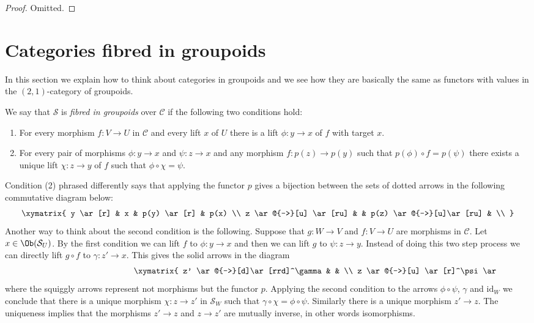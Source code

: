 \begin{proof}
Omitted.
\end{proof}





\section{Categories fibred in groupoids}
\label{section-fibred-groupoids}

\noindent
In this section we explain how to think about categories in groupoids
and we see how they are basically the same as functors with
values in the $(2, 1)$-category of groupoids.

\begin{definition}
\label{definition-fibred-groupoids}
We say that $\mathcal{S}$ is {\it fibred in groupoids} over $\mathcal{C}$ if
the following two conditions hold:
\begin{enumerate}
\item For every morphism $f : V \to U$ in $\mathcal{C}$ and every
lift $x$ of $U$ there is a lift $\phi : y \to x$ of $f$ with
target $x$.
\item For every pair of morphisms $\phi : y \to x$ and $ \psi : z \to x$
and any morphism $f : p(z) \to p(y)$ such that $p(\phi) \circ f = p(\psi)$
there exists a unique lift $\chi : z \to y$ of $f$ such that
$\phi \circ \chi = \psi$.
\end{enumerate}
\end{definition}

\noindent
Condition (2) phrased differently says that
applying the functor $p$ gives a bijection between the sets
of dotted arrows in the following commutative diagram below:
$$
\xymatrix{
y \ar[r] & x & p(y) \ar[r] & p(x) \\
z \ar@{-->}[u] \ar[ru] & & p(z) \ar@{-->}[u]\ar[ru] & \\
}
$$
Another way to think about the second condition is the following.
Suppose that $g : W \to V$ and $f : V \to U$ are morphisms in $\mathcal{C}$.
Let $x \in \Ob(\mathcal{S}_U)$. By the first condition we can lift
$f$ to $ \phi : y \to x$ and then we can lift $g$ to $\psi : z \to y$.
Instead of doing this two step process we can directly lift $g \circ f$ to
$\gamma : z' \to x$. This gives the solid arrows in the diagram
\begin{equation}
\label{equation-fibred-groupoids}
\vcenter{
\xymatrix{
z' \ar@{-->}[d]\ar[rrd]^\gamma & & \\
z \ar@{-->}[u] \ar[r]^\psi \ar@{~>}[d]^p &
y \ar[r]^\phi \ar@{~>}[d]^p &
x \ar@{~>}[d]^p
\\
W \ar[r]^g & V \ar[r]^f & U \\
}
}
\end{equation}
where the squiggly arrows represent not morphisms but the functor $p$.
Applying the second condition to the arrows $\phi \circ \psi$, $\gamma$
and $\text{id}_W$ we conclude that there is a unique morphism
$\chi : z \to z'$ in $\mathcal{S}_W$ such that
$\gamma \circ \chi = \phi \circ \psi$. Similarly there is a unique morphism
$z' \to z$. The uniqueness implies that the morphisms $z' \to z$ and
$z\to z'$ are mutually inverse, in other words isomorphisms.

